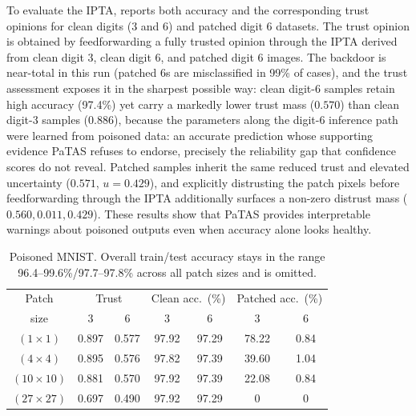 To evaluate the IPTA,  reports both accuracy and the corresponding trust opinions for clean digits (3 and 6) and patched digit 6 datasets. The trust opinion is obtained by feedforwarding a fully trusted opinion through the IPTA derived from clean digit 3, clean digit 6, and patched digit 6 images. The backdoor is near-total in this run (patched 6s are misclassified in 99\% of cases), and the trust assessment exposes it in the sharpest possible way: clean digit-6 samples retain high accuracy (97.4\%) yet carry a markedly lower trust mass ($0.570$) than clean digit-3 samples ($0.886$), because the parameters along the digit-6 inference path were learned from poisoned data: an accurate prediction whose supporting evidence PaTAS refuses to endorse, precisely the reliability gap that confidence scores do not reveal. Patched samples inherit the same reduced trust and elevated uncertainty ($0.571$, $u = 0.429$), and explicitly distrusting the patch pixels before feedforwarding through the IPTA additionally surfaces a non-zero distrust mass ($0.560, 0.011, 0.429$). These results show that PaTAS provides interpretable warnings about poisoned outputs even when accuracy alone looks healthy.

\begin{table}[ht]
\centering
\setlength{\tabcolsep}{4pt}
\begin{tabular}{ccccccc}
\hline
Patch & \multicolumn{2}{c}{Trust} & \multicolumn{2}{c}{Clean acc.\ (\%)} & \multicolumn{2}{c}{Patched acc.\ (\%)} \\
size & 3 & 6 & 3 & 6 & 3 & 6 \\
\hline
\((1 \times 1)\) & 0.897 & 0.577 & 97.92 & 97.29 & 78.22 & 0.84 \\
\((4 \times 4)\) & 0.895 & 0.576 & 97.82 & 97.39 & 39.60 & 1.04 \\
\((10 \times 10)\) & 0.881 & 0.570 & 97.92 & 97.39 & 22.08 & 0.84 \\
\((27 \times 27)\) & 0.697 & 0.490 & 97.92 & 97.29 & 0 & 0 \\
\hline
\end{tabular}
\caption{Poisoned MNIST. Overall train/test accuracy stays in the range 96.4--99.6\%/97.7--97.8\% across all patch sizes and is omitted.}
\label{tab:mnistpois}
\end{table}


